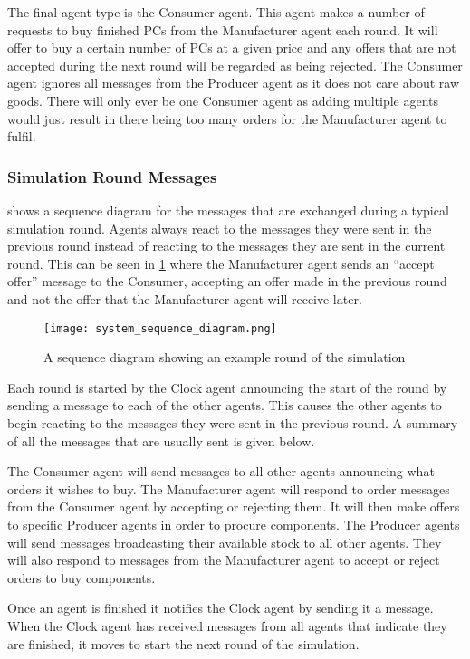 The final agent type is the Consumer agent.
This agent makes a number of requests to buy finished PCs from the Manufacturer agent each round.
It will offer to buy a certain number of PCs at a given price and any offers that are not accepted during the next round will be regarded as being rejected.
The Consumer agent ignores all messages from the Producer agent as it does not care about raw goods.
There will only ever be one Consumer agent as adding multiple agents would just result in there being too many orders for the Manufacturer agent to fulfil.

\subsubsection{Simulation Round Messages}

 shows a sequence diagram for the messages that are exchanged during a typical simulation round.
Agents always react to the messages they were sent in the previous round instead of reacting to the messages they are sent in the current round.
This can be seen in \cref{fig:system_sequence_diagram} where the Manufacturer agent sends an ``accept offer'' message to the Consumer, accepting an offer made in the previous round and not the offer that the Manufacturer agent will receive later.

\begin{figure}[ht]
    \centering
    \texttt{[image: system\_sequence\_diagram.png]}
    \caption{A sequence diagram showing an example round of the simulation}\label{fig:system_sequence_diagram}
\end{figure}

Each round is started by the Clock agent announcing the start of the round by sending a message to each of the other agents.
This causes the other agents to begin reacting to the messages they were sent in the previous round.
A summary of all the messages that are usually sent is given below.

The Consumer agent will send messages to all other agents announcing what orders it wishes to buy.
The Manufacturer agent will respond to order messages from the Consumer agent by accepting or rejecting them.
It will then make offers to specific Producer agents in order to procure components.
The Producer agents will send messages broadcasting their available stock to all other agents.
They will also respond to messages from the Manufacturer agent to accept or reject orders to buy components.

Once an agent is finished it notifies the Clock agent by sending it a message.
When the Clock agent has received messages from all agents that indicate they are finished, it moves to start the next round of the simulation.
